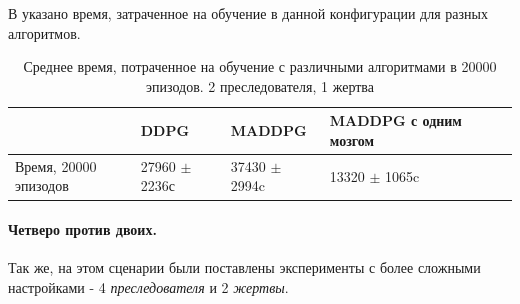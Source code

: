 В  указано время, затраченное на обучение в данной конфигурации для разных алгоритмов.

\begin{table}[t!]
    \centering\small
    \caption{Среднее время, потраченное на обучение с различными алгоритмами в 20000 эпизодов. 2 преследователя, 1 жертва}
    \label{tab-st-time}
    \begin{tabular}{|l|l|l|l|l|l|}
        \hline
        & DDPG       & MADDPG      & MADDPG с одним мозгом \\
        \hline
        Время, 20000 эпизодов & 27960 $\pm$ 2236с & 37430 $\pm$ 2994c & 13320 $\pm$ 1065c \\ \hline
    \end{tabular}
    \normalsize%
\end{table}

\paragraph{Четверо против двоих.}

Так же, на этом сценарии были поставлены эксперименты с более сложными настройками - 4 \textit{преследователя} и 2 \textit{жертвы}.

